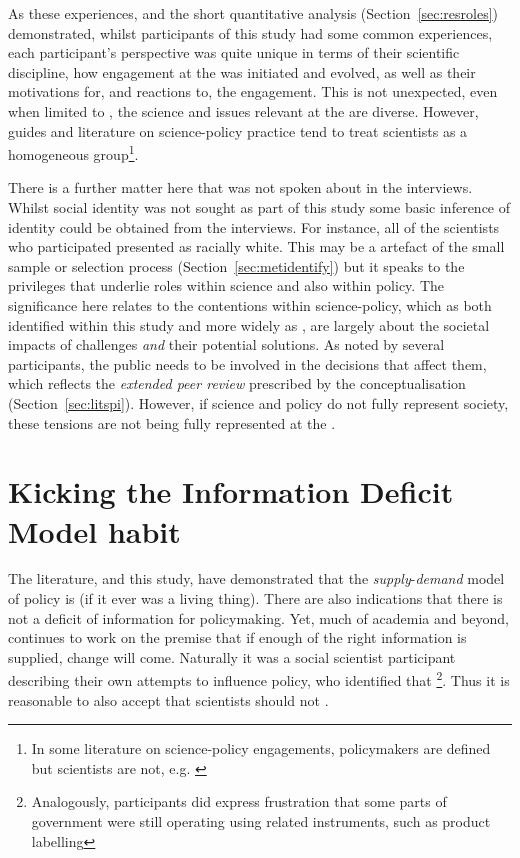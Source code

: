 As these experiences, and the short quantitative analysis (Section~\ref{sec:resroles}) demonstrated, whilst participants of this study had some common experiences, each participant's perspective was quite unique in terms of their scientific discipline, how engagement at the \SPI{} was initiated and evolved, as well as their motivations for, and reactions to, the engagement. This is not unexpected, even when limited to \CAN{}, the science and issues relevant at the \SPI{} are diverse. However, guides and literature on science-policy practice tend to treat scientists as a homogeneous group\footnote{In some literature on science-policy engagements, policymakers are defined but scientists are not, e.g. \textcite{BA2024trust}}. 

There is a further matter here that was not spoken about in the interviews. Whilst social identity was not sought as part of this study some basic inference of identity could be obtained from the interviews. For instance, all of the scientists who participated presented as racially white. This may be a artefact of the small sample or selection process (Section~\ref{sec:metidentify}) but it speaks to the privileges that underlie roles within science and also within policy. The significance here relates to the contentions within \CAN{} science-policy, which as both identified within this study and more widely as \PNS, are largely about the societal impacts of \CAN{} challenges \emph{and} their potential solutions. As noted by several participants, the public needs to be involved in the decisions that affect them, which reflects the \emph{extended peer review} prescribed by the \PNS{} conceptualisation (Section~\ref{sec:litspi}). However, if science and policy do not fully represent society, these tensions are not being fully represented at the \SPI{}. 

\section{Kicking the Information Deficit Model habit}\label{sec:disdeficit}

The literature, and this study, have demonstrated that the \emph{supply}-\emph{demand} model of policy is  (if it ever was a living thing). There are also indications that there is not a deficit of information for \CAN{} policymaking. Yet, much of academia and beyond, continues to work on the \IDM{} premise that if enough of the right information is supplied, change will come. Naturally it was a social scientist participant describing their own attempts to influence policy, who identified that \footnote{Analogously, participants did express frustration that some parts of government were still operating using related instruments, such as product labelling}. Thus it is reasonable to also accept that scientists should not .


